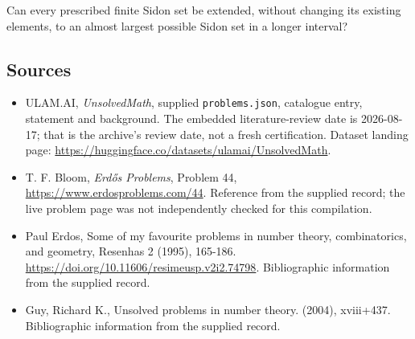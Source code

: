 \documentclass[11pt,a4paper]{article}
\begin{document}
Can every prescribed finite Sidon set be extended, without changing its existing elements, to an almost largest possible Sidon set in a longer interval?

\subsection{Sources}

{\small

\begin{itemize}

\item[\hypertarget{source:statement:1}{S1}] ULAM.AI, \emph{UnsolvedMath}, supplied \texttt{problems.json}, catalogue entry, statement and background. The embedded literature-review date is 2026-08-17; that is the archive’s review date, not a fresh certification. Dataset landing page: \url{https://huggingface.co/datasets/ulamai/UnsolvedMath}.

\item[\hypertarget{source:statement:2}{S2}] T. F. Bloom, \emph{Erdős Problems}, Problem 44, \url{https://www.erdosproblems.com/44}. Reference from the supplied record; the live problem page was not independently checked for this compilation.

\item[\hypertarget{source:statement:3}{S3}] Paul Erdos, Some of my favourite problems in number theory, combinatorics, and geometry, Resenhas 2 (1995), 165-186. \url{https://doi.org/10.11606/resimeusp.v2i2.74798}. Bibliographic information from the supplied record.

\item[\hypertarget{source:statement:4}{S4}] Guy, Richard K., Unsolved problems in number theory. (2004), xviii+437. Bibliographic information from the supplied record.

\end{itemize}

}

\label{end:statement}
\end{document}
